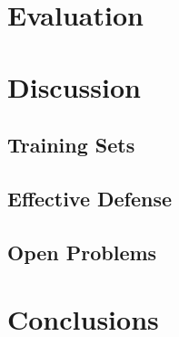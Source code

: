 \documentclass{acm_proc_article-sp}
\begin{document}
\section{Evaluation}

\section{Discussion}
    \subsection{Training Sets}
    \subsection{Effective Defense}
    \subsection{Open Problems}

\section{Conclusions}

	

{}  %
\nocite{*}
%
%
\balancecolumns
\end{document}
